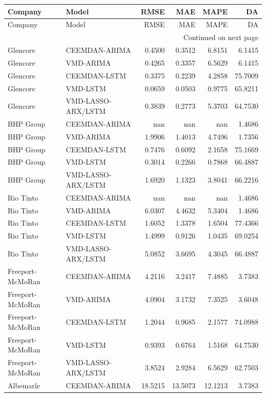 \begin{longtable}{llrrrr}
\toprule
Company & Model & RMSE & MAE & MAPE & DA \\
\midrule
\endfirsthead
\toprule
Company & Model & RMSE & MAE & MAPE & DA \\
\midrule
\endhead
\midrule
\multicolumn{6}{r}{Continued on next page} \\
\midrule
\endfoot
\bottomrule
\endlastfoot
Glencore & CEEMDAN-ARIMA & 0.4500 & 0.3512 & 6.8151 & 6.1415 \\
Glencore & VMD-ARIMA & 0.4265 & 0.3357 & 6.5629 & 6.1415 \\
Glencore & CEEMDAN-LSTM & 0.3375 & 0.2239 & 4.2858 & 75.7009 \\
Glencore & VMD-LSTM & 0.0659 & 0.0503 & 0.9775 & 65.8211 \\
Glencore & VMD-LASSO-ARX/LSTM & 0.3839 & 0.2773 & 5.3703 & 64.7530 \\
BHP Group & CEEMDAN-ARIMA & nan & nan & nan & 1.4686 \\
BHP Group & VMD-ARIMA & 1.9906 & 1.4013 & 4.7496 & 1.7356 \\
BHP Group & CEEMDAN-LSTM & 0.7476 & 0.6092 & 2.1658 & 75.1669 \\
BHP Group & VMD-LSTM & 0.3014 & 0.2266 & 0.7868 & 66.4887 \\
BHP Group & VMD-LASSO-ARX/LSTM & 1.6920 & 1.1323 & 3.8041 & 66.2216 \\
Rio Tinto & CEEMDAN-ARIMA & nan & nan & nan & 1.4686 \\
Rio Tinto & VMD-ARIMA & 6.0307 & 4.4632 & 5.3404 & 1.4686 \\
Rio Tinto & CEEMDAN-LSTM & 1.6052 & 1.3378 & 1.6504 & 77.4366 \\
Rio Tinto & VMD-LSTM & 1.4999 & 0.9126 & 1.0435 & 69.0254 \\
Rio Tinto & VMD-LASSO-ARX/LSTM & 5.0852 & 3.6695 & 4.3045 & 66.4887 \\
Freeport-McMoRan & CEEMDAN-ARIMA & 4.2116 & 3.2417 & 7.4885 & 3.7383 \\
Freeport-McMoRan & VMD-ARIMA & 4.0904 & 3.1732 & 7.3525 & 3.6048 \\
Freeport-McMoRan & CEEMDAN-LSTM & 1.2044 & 0.9685 & 2.1577 & 74.0988 \\
Freeport-McMoRan & VMD-LSTM & 0.9393 & 0.6764 & 1.5168 & 64.7530 \\
Freeport-McMoRan & VMD-LASSO-ARX/LSTM & 3.8524 & 2.9284 & 6.5629 & 62.7503 \\
Albemarle & CEEMDAN-ARIMA & 18.5215 & 13.5073 & 12.1213 & 3.7383 \\

\end{longtable}
